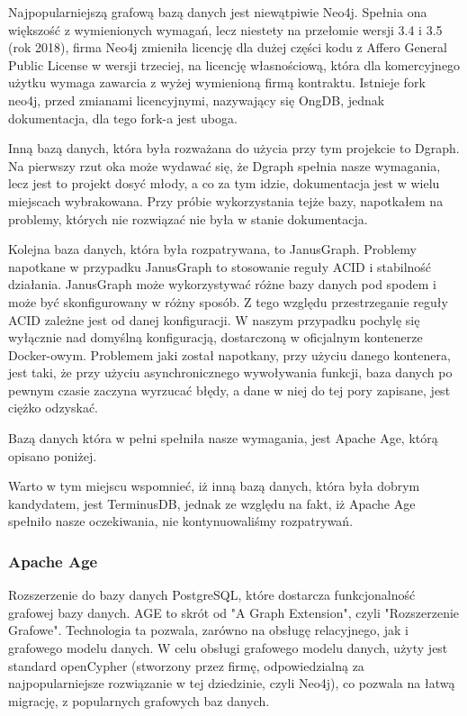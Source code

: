 \documentclass[a4paper, 12pt]{article}
\begin{document}
Najpopularniejszą grafową bazą danych jest niewątpiwie Neo4j. Spełnia ona większość z wymienionych wymagań, lecz niestety na przełomie wersji 3.4 i 3.5 (rok 2018), firma Neo4j zmieniła licencję dla dużej części kodu z Affero General Public License w wersji trzeciej, na licencję własnościową, która dla komercyjnego użytku wymaga zawarcia z wyżej wymienioną firmą kontraktu.\cite{neo4jLicenseChangeBlog} Istnieje fork neo4j, przed zmianami licencyjnymi, nazywający się OngDB, jednak dokumentacja, dla tego fork-a jest uboga.

Inną bazą danych, która była rozważana do użycia przy tym projekcie to Dgraph. Na pierwszy rzut oka może wydawać się, że Dgraph spełnia nasze wymagania, lecz jest to projekt dosyć młody, a co za tym idzie, dokumentacja jest w wielu miejscach wybrakowana. Przy próbie wykorzystania tejże bazy, napotkałem na problemy, których nie rozwiązać nie była w stanie dokumentacja.

Kolejna baza danych, która była rozpatrywana, to JanusGraph. Problemy napotkane w przypadku JanusGraph to stosowanie reguły ACID i stabilność działania. JanusGraph może wykorzystywać różne bazy danych pod spodem i może być skonfigurowany w różny sposób. Z tego względu przestrzeganie reguły ACID zależne jest od danej konfiguracji. W naszym przypadku pochylę się wyłącznie nad domyślną konfiguracją, dostarczoną w oficjalnym kontenerze Docker-owym. Problemem jaki został napotkany, przy użyciu danego kontenera, jest taki, że przy użyciu asynchronicznego wywoływania funkcji, baza danych po pewnym czasie zaczyna wyrzucać błędy, a dane w niej do tej pory zapisane, jest ciężko odzyskać.

Bazą danych która w pełni spełniła nasze wymagania, jest Apache Age, którą opisano poniżej.

Warto w tym miejscu wspomnieć, iż inną bazą danych, która była dobrym kandydatem, jest TerminusDB, jednak ze względu na fakt, iż Apache Age spełniło nasze oczekiwania, nie kontynuowaliśmy rozpatrywań.

\subsubsection{Apache Age}
Rozszerzenie do bazy danych PostgreSQL, które dostarcza funkcjonalność grafowej bazy danych. AGE to skrót od "A Graph Extension", czyli "Rozszerzenie Grafowe". Technologia ta pozwala, zarówno na obsługę relacyjnego, jak i grafowego modelu danych. W celu obsługi grafowego modelu danych, użyty jest standard openCypher (stworzony przez firmę, odpowiedzialną za najpopularniejsze rozwiązanie w tej dziedzinie, czyli Neo4j\cite{openCypherAbout}), co pozwala na łatwą migrację, z popularnych grafowych baz danych.\cite{ApacheAGEOverview}
\end{document}

